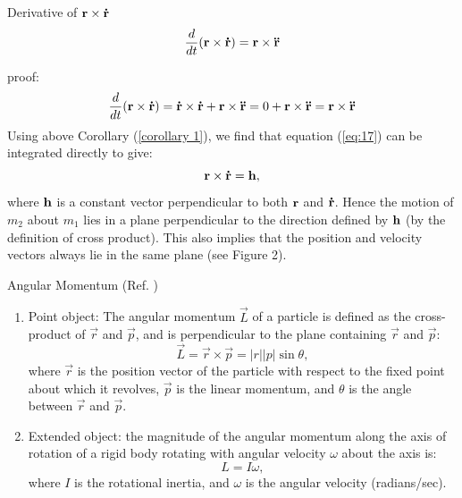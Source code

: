 \begin{Corollary}{Derivative of ${\bf r}\times{\bf{\dot{r}}}$}{}
    \begin{equation}
        \frac{d}{dt}({\bf r}\times{\bf{\dot{r}}}) = {\bf{r}}\times{\bf{\ddot{r}}}
    \end{equation}
    \label{corollary 1}
\end{Corollary}
proof: 
\begin{equation}
    \frac{d}{dt}({\bf r}\times{\bf{\dot{r}}}) = {\bf\dot{r}}\times{\bf{\dot{r}}} + {\bf r}\times{\bf{\ddot{r}}} = 0 + {\bf r}\times{\bf{\ddot{r}}} = {\bf r}\times{\bf{\ddot{r}}}
\end{equation}
Using above Corollary (\ref{corollary 1}), we find that equation (\ref{eq:17}) can be integrated directly to give:
\begin{equation}
    {\bf r} \times {\bf{\dot{r}}} = {\bf{h}},
    \label{eq:r and dot r}
\end{equation}
where ${\bf h}$ is a constant vector perpendicular to both $\bf r$ and $\bf{\dot{r}}$. Hence the motion of $m_2$ about $m_1$ lies in a plane perpendicular to the direction defined by ${\bf h}$ (by the definition of cross product). This also implies that the position and velocity vectors always lie in the same plane (see Figure 2).

\begin{Definition}{Angular Momentum (Ref. \cite{AngularMomentum:2016})}{}
    \begin{enumerate}
        \item Point object: The angular momentum $\vec{L}$ of a particle is defined as the cross-product of $\vec{r}$ and $\vec{p}$, and is perpendicular to the plane containing $\vec{r}$ and $\vec{p}$:
        \begin{equation}
            \vec{L} = \vec{r} \times \vec{p} = \left|r\right|\left|p\right|\sin{\theta},
        \end{equation}
        where $\vec{r}$ is the position vector of the particle with respect to the fixed point about which it revolves, $\vec{p}$ is the linear momentum, and $\theta$ is the angle between $\vec{r}$ and $\vec{p}$.
        \item Extended object: the magnitude of the angular momentum along the axis of rotation of a rigid body rotating with angular velocity $\omega$ about the axis is:
        \begin{equation}
            L = I{\omega},
        \end{equation}
        where $I$ is the rotational inertia, and $\omega$ is the angular velocity (radians/sec).
    \end{enumerate}
\end{Definition}

